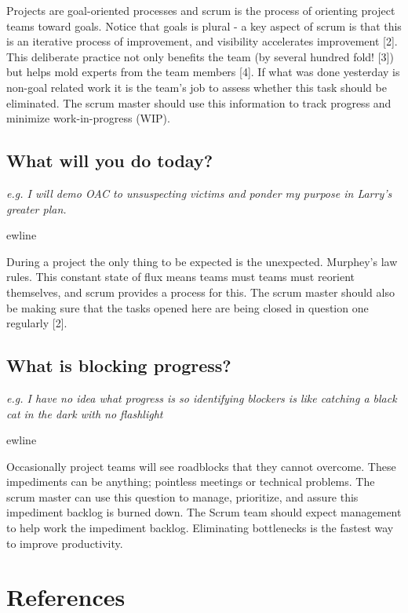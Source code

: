 \documentclass[12pt]{article}%
\begin{document}
Projects are goal-oriented processes and scrum is the process of orienting project teams toward goals. Notice that goals is plural -
a key aspect of scrum is that this is an iterative process of improvement, and visibility accelerates improvement [2]. This deliberate practice not only benefits the team (by several hundred fold! [3]) but helps mold experts from the team members [4]. If what was done yesterday is non-goal related work it is the team's job to assess whether this task should be eliminated. The scrum master should use this information to track progress and minimize work-in-progress (WIP). 

\vspace{5cm}


\subsection{What will you do today?}
\textit{e.g. I will demo OAC to unsuspecting victims and ponder my purpose in Larry's greater plan.}

ewline 

During a project the only thing to be expected is the unexpected. Murphey's law rules. 
This constant state of flux means teams must teams must reorient themselves, and scrum provides a process for this. 
The scrum master should also be making sure that the tasks opened here are being closed in question one regularly [2].

\vspace{6.5cm}

\subsection{What is blocking progress?}
\textit{e.g. I have no idea what progress is so identifying blockers is like catching a black cat in the dark with no flashlight}

ewline

Occasionally project teams will see roadblocks that they cannot overcome. These impediments can be anything; pointless meetings or technical problems. 
The scrum master can use this question to manage, prioritize, and assure this impediment backlog is burned down. 
The Scrum team should expect management to help work the impediment backlog. Eliminating bottlenecks is the fastest way to improve productivity.

\vspace{6.5cm}

\section{References}
\end{document}

